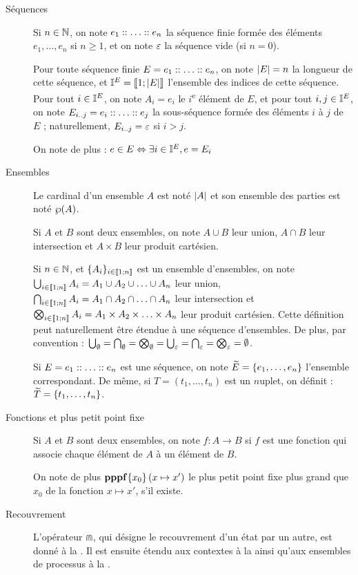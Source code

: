 \begin{description}
  \item[Séquences]
    Si $n \in \mathbb{N}$, on note $e_1 :: \ldots :: e_n$ la séquence finie formée
    des éléments $e_1, \ldots, e_n$ si $n \geq 1$,
    et on note $\varepsilon$ la séquence vide (si $n = 0$).
    
    Pour toute séquence finie $E = e_1 :: \ldots :: e_n$,
    on note $|E| = n$ la longueur de cette séquence,
    et $\mathbb{I}^{E} = \mathopen{\llbracket}1\mathclose{};|E|\mathclose{\rrbracket}$ l'ensemble des indices de cette séquence.
    Pour tout $i \in \mathbb{I}^{E}$, on note $A_i = e_i$ le $i$\textsuperscript{e} élément de $E$,
    et pour tout $i,j \in \mathbb{I}^{E}$, on note $E_{i..j} = e_i :: \ldots :: e_j$
    la sous-séquence formée des éléments $i$ à $j$ de $E$ ;
    naturellement, $E_{i..j} = \varepsilon$ si $i > j$.
    
    On note de plus : $e \in E \Leftrightarrow \exists i \in \mathbb{I}^{E}, e = E_i$
  
  \item[Ensembles]
    Le cardinal d'un ensemble $A$ est noté $|A|$
    et son ensemble des parties est noté $\wp(A)$.
    
    Si $A$ et $B$ sont deux ensembles, on note
    $A \cup B$ leur union, $A \cap B$ leur intersection et $A \times B$ leur produit cartésien.
    
    Si $n \in \mathbb{N}$, et $\{ A_i \}_{i \in \mathopen{\llbracket}1\mathclose{};n\mathclose{\rrbracket}}$ est un ensemble d'ensembles, on note
    $\bigcup_{i \in \mathopen{\llbracket}1\mathclose{};n\mathclose{\rrbracket}} A_i = A_1 \cup A_2 \cup \ldots \cup A_n$ leur union,
    $\bigcap_{i \in \mathopen{\llbracket}1\mathclose{};n\mathclose{\rrbracket}} A_i = A_1 \cap A_2 \cap \ldots \cap A_n$ leur intersection et
    $\bigotimes_{i \in \mathopen{\llbracket}1\mathclose{};n\mathclose{\rrbracket}} A_i = A_1 \times A_2 \times \ldots \times A_n$
    leur produit cartésien.
    Cette définition peut naturellement être étendue à une séquence d'ensembles.
    De plus, par convention :
    $\bigcup_{\emptyset} = \bigcap_{\emptyset} = \bigotimes_{\emptyset} =
      \bigcup_{\varepsilon} = \bigcap_{\varepsilon} = \bigotimes_{\varepsilon} = \emptyset$.
    
    Si $E = e_1 :: \ldots :: e_n$ est une séquence,
    on note $\widetilde{E} = \{ e_1, \ldots, e_n \}$ l'ensemble correspondant.
    De même, si $T = (t_1, \ldots, t_n)$ est un $n$\nbd uplet,
    on définit : $\widetilde{T} = \{ t_1, \ldots, t_n \}$.
  
  \item[Fonctions et plus petit point fixe]
    Si $A$ et $B$ sont deux ensembles,
    on note $f : A \rightarrow B$
    si $f$ est une fonction qui associe chaque élément de $A$ à un élément de $B$.
    
    On note de plus $\mathbf{pppf}\{x_0\}\left(x\mapsto x'\right)$ le plus petit point fixe plus grand que $x_0$
    de la fonction $x \mapsto x'$, s'il existe.
  
  \item[Recouvrement]
    L'opérateur $\Cap$, qui désigne le recouvrement d'un état par un autre,
    est donné à la .
    Il est ensuite étendu
    aux contextes à la 
    ainsi qu'aux ensembles de processus à la .

\end{description}
